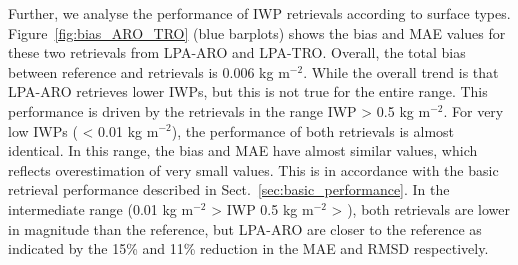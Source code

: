 \documentclass[amt, manuscript]{copernicus}
\begin{document}

Further, we analyse the performance of IWP retrievals according to surface types. Figure~\ref{fig:bias_ARO_TRO} (blue barplots) shows the bias and MAE values for these two retrievals from LPA-ARO and LPA-TRO. Overall, the total bias between reference and retrievals is 0.006\,\,kg m$^{-2}$. While the overall trend is that LPA-ARO retrieves lower IWPs, but this is not true for the entire range. This performance is driven by the retrievals in the range IWP > 0.5\,\,kg m$^{-2}$. For very low IWPs ( < 0.01\,\,kg m$^{-2}$), the performance of both retrievals is almost identical. In this range, the bias and MAE have almost similar values, which reflects overestimation of very small values. This is in accordance with the basic retrieval performance described in Sect.~\ref{sec:basic_performance}. In the intermediate range (0.01\,\,kg m$^{-2}$ > IWP 0.5\,\,kg m$^{-2}$ > ), both retrievals are lower in magnitude than the reference, but LPA-ARO are closer to the reference as indicated by the 15\% and 11\% reduction in the MAE and RMSD respectively. 
\end{document}
